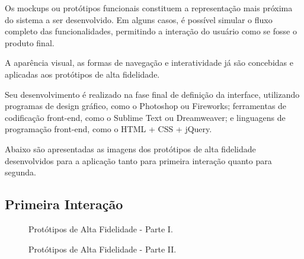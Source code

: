 		Os mockups ou protótipos funcionais constituem a representação mais próxima do sistema a ser desenvolvido. Em alguns casos, é possível simular o fluxo completo das funcionalidades, permitindo a interação do usuário como se fosse o produto final.

		A aparência visual, as formas de navegação e interatividade já são concebidas e aplicadas aos protótipos de alta fidelidade.

		Seu desenvolvimento é realizado na fase final de definição da interface, utilizando programas de design gráfico, como o Photoshop ou Fireworks; ferramentas de codificação front-end, como o Sublime Text ou Dreamweaver; e linguagens de programação front-end, como o HTML + CSS + jQuery. \cite{alta}

		Abaixo são apresentadas as imagens dos protótipos de alta fidelidade desenvolvidos para a aplicação tanto para primeira interação quanto para segunda.

		\newpage
		\begin{landscape}
		\subsection[Primeira Interação]{Primeira Interação}
		\label{sec:prototipos_alta_1}
			
			\begin{figure}[!htb]
				\centering
				\quad %
				\quad
				\quad
				\caption[Protótipos de Alta Fidelidade - Parte I]{Protótipos de Alta Fidelidade - Parte I.}
				\label{fig03-1int}
			\end{figure}

			\begin{figure}[!htb]
				\centering
				\quad
				\quad
				\quad
				\quad
				\quad
				\quad
				\caption[Protótipos de Alta Fidelidade - Parte II]{Protótipos de Alta Fidelidade - Parte II.}
				\label{fig03-1int}
			\end{figure}
		\end{landscape}

